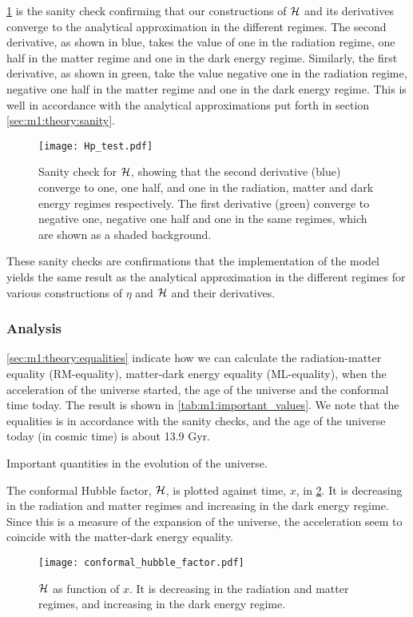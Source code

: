     \cref{fig:m1:Hp_tests} is the sanity check confirming that our constructions of $\mathcal{H}$ and its derivatives converge to the analytical approximation in the different regimes. The second derivative, as shown in blue, takes the value of one in the radiation regime, one half in the matter regime and one in the dark energy regime. Similarly, the first derivative, as shown in green, take the value negative one in the radiation regime, negative one half in the matter regime and one in the dark energy regime. This is well in accordance with the analytical approximations put forth in section \cref{sec:m1:theory:sanity}. 

    \begin{figure}
        \texttt{[image: Hp\_test.pdf]}
        \caption{Sanity check for $\mathcal{H}$, showing that the second derivative (blue) converge to one, one half, and one in the radiation, matter and dark energy regimes respectively. The first derivative (green) converge to negative one, negative one half and one in the same regimes, which are shown as a shaded background.}
        \label{fig:m1:Hp_tests}
    \end{figure}

    These sanity checks are confirmations that the implementation of the model yields the same result as the analytical approximation in the different regimes for various constructions of $\eta$ and $\mathcal{H}$ and their derivatives.
    
\subsubsection{Analysis}

    \cref{sec:m1:theory:equalities} indicate how we can calculate the radiation-matter equality (RM-equality), matter-dark energy equality (ML-equality), when the acceleration of the universe started, the age of the universe and the conformal time today. The result is shown in \cref{tab:m1:important_values}. We note that the equalities is in accordance with the sanity checks, and the age of the universe today (in cosmic time) is about 13.9 Gyr. 
    \begin{table}
        
        \caption{Important quantities in the evolution of the universe.}
        \label{tab:m1:important_values}
    \end{table}

    The conformal Hubble factor, $\mathcal{H}$, is plotted against time, $x$, in \cref{fig:m1:conformal_hubble_factor_Hp}. It is decreasing in the radiation and matter regimes and increasing in the dark energy regime. Since this is a measure of the expansion of the universe, the acceleration seem to coincide with the matter-dark energy equality. 
    \begin{figure}
        \texttt{[image: conformal\_hubble\_factor.pdf]}
        \caption{$\mathcal{H}$ as function of $x$. It is decreasing in the radiation and matter regimes, and increasing in the dark energy regime.}
        \label{fig:m1:conformal_hubble_factor_Hp}
    \end{figure}

